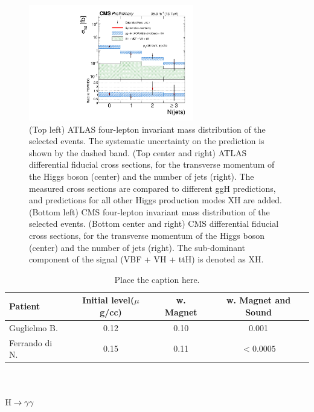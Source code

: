 \documentclass[10pt]{article}
\begin{document}
\begin{figure}[htb]
\includegraphics[height=2in]{figures/CMS-HIG-16-041__Figure_009-c__njets.pdf}
\caption{
  (Top left) ATLAS four-lepton invariant mass distribution of the selected
  events. The systematic uncertainty on the prediction is shown by the dashed
  band.
  (Top center and right) ATLAS differential fiducial cross sections, for the
  transverse momentum of the Higgs boson (center) and the number of jets (right).
  The measured cross sections are compared to different ggH predictions, and
  predictions for all other Higgs production modes XH are added.
  (Bottom left) CMS four-lepton invariant mass distribution of the selected
  events.
  (Bottom center and right) CMS differential fiducial cross sections, for the
  transverse momentum of the Higgs boson (center) and the number of jets (right).
  The sub-dominant component of the signal (VBF + VH + ttH) is denoted as XH.
}
\label{fig:figure-ZZ}
\end{figure}


\begin{table}[t]
\begin{center}
\begin{tabular}{l|ccc}  
Patient &  Initial level($\mu$g/cc) &  w. Magnet &  
w. Magnet and Sound \\ \hline
 Guglielmo B.  &   0.12     &     0.10      &     0.001  \\
 Ferrando di N. &  0.15     &     0.11      &  $< 0.0005$ \\ \hline
\end{tabular}
\caption{Place the caption here.}
\label{tab:table1}
\end{center}
\end{table}


\section{\boldmath ${\rm H}\to\gamma\gamma$}
\end{document}
